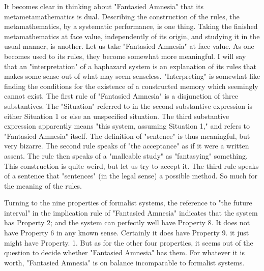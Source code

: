\documentclass[10pt,twoside]{memoir}
\begin{document}
\begin{enumerate}
{\begin{enumerate}
\begin{sysrules}
\begin{sysrules}
\begin{sysrules}
\begin{sysrules}
It becomes clear in thinking about "Fantasied Amnesia" that its 
metametamathematics is dual. Describing the construction of the rules, the 
metamathematics, by a systematic performance, is one thing. Taking the 
finished metamathematics at face value, independently of its origin, and 
studying it in the usual manner, is another. Let us take "Fantasied Amnesia" 
at face value. As one becomes used to its rules, they become somewhat more 
meaningful. I will say that an "interpretation" of a haphazard system is an 
explanation of its rules that makes some sense out of what may seem 
senseless. "Interpreting" is somewhat like finding the conditions for the 
existence of a constructed memory which seemingly cannot exist. The first 
rule of "Fantasied Amnesia" is a disjunction of three substantives. The 
"Situation" referred to in the second substantive expression is either 
Situation 1 or else an unspecified situation. The third substantive expression 
apparently means "this system, assuming Situation 1," and refers to 
"Fantasied Amnesia" itself. The definition of "sentence" is thus meaningful, 
but very bizarre. The second rule speaks of "the acceptance" as if it were a 
written assent. The rule then speaks of a "malleable study" as "fantasying" 
something. This construction is quite weird, but let us try to accept it. The 
third rule speaks of a sentence that "sentences" (in the legal sense) a possible 
method. So much for the meaning of the rules. 

Turning to the nine properties of formalist systems, the reference to 
"the future interval" in the implication rule of "Fantasied Amnesia" 
indicates that the system has Property 2; and the system can perfectly well 
have Property 8. It does not have Property 6 in any known sense. Certainly 
it does have Property 9. it just might have Property. 1. But as for the other 
four properties, it seems out of the question to decide whether "Fantasied 
Amnesia" has them. For whatever it is worth, "Fantasied Amnesia" is on 
balance incomparable to formalist systems. 


\end{sysrules}
\end{sysrules}
\end{sysrules}
\end{sysrules}
\end{enumerate}}
\end{enumerate}
\end{document}
